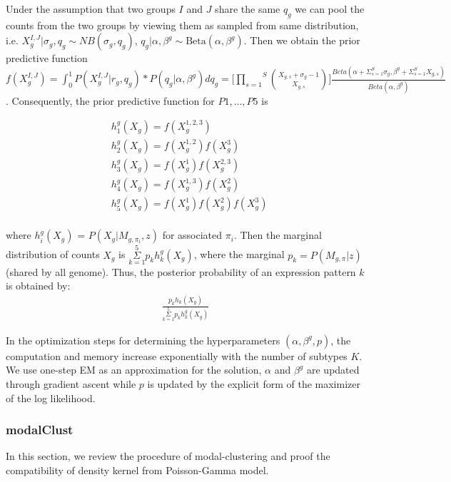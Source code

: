 \documentclass[aoas,preprint]{imsart}
\begin{document}
Under the assumption that two groups $I$ and $J$ share the same $q_g$ we can pool the counts from the two groups by viewing them as sampled from same distribution, i.e. $X_g^{I, J} | \sigma_{g}, q_g \sim NB(\sigma_{g}, q_g)$, $q_g | \alpha, \beta^{g} \sim \text{Beta}(\alpha, \beta^{g})$. Then we obtain the prior predictive function $f(X_g^{I,J}) = \int_0 ^1 P(X_g^{I,J} | r_{g}, q_g) * P(q_g | \alpha, \beta^{g}) dq_g = \Big[ \overset{S}{\underset{s = 1}{\prod}} {X_{g,s} + \sigma_{g} - 1 \choose X_{g,s}} \Big] \frac{Beta(\alpha + \Sigma_{s = 1}^S \sigma_{g}, \beta^{g} + \Sigma_{s = 1}^S X_{g,s})}{Beta(\alpha, \beta^{g})}$.  Consequently, the prior predictive function for $P1, ..., P5$ is


\begin{align*}
&h_1^{g}(X_g) = f(X_g^{1,2,3})\\
&h_2^{g}(X_g) = f(X_g^{1,2})f(X_g^3)\\
&h_3^{g}(X_g) = f(X_g^1)f(X_g^{2,3})\\
&h_4^{g}(X_g) = f(X_g^{1,3})f(X_g^2)\\
&h_5^{g}(X_g) = f(X_g^1)f(X_g^2)f(X_g^3)\\
\end{align*}

where $h_i^{g}(X_g)$ = $P(X_g | M_{g,\pi_i},z)$ for associated $\pi_i$.
Then the marginal distribution of counts $X_g$ is $\overset{5}{\underset{k = 1}{\Sigma}} p_k h_k^{g}(X_g)$, 
where the marginal $p_k = P(M_{g,\pi} | z)$(shared by all genome). Thus, the posterior probability of an expression pattern $k$ is obtained by:
\begin{eqnarray*}
\frac{p_k h_k(X_g)}{\overset{5}{\underset{k = 1}{\Sigma}} p_k h_k^{g}(X_g)}
\end{eqnarray*}


In the optimization steps for determining the hyperparameters $(\alpha, \beta^g, p)$, the computation and memory increase exponentially with the number of subtypes $K$. 
We use one-step EM as an approximation for the solution, $\alpha$ and $\beta^g$ are updated through gradient ascent 
while $p$ is updated by the explicit form of the maximizer of the log likelihood.


\subsubsection{modalClust}

In this section, we review the procedure of modal-clustering and proof the compatibility of density kernel from Poisson-Gamma model.
\end{document}
